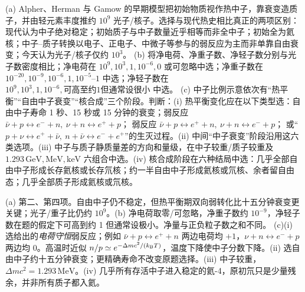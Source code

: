 \begin{exercise}
(a) Alpher、Herman 与 Gamow 的早期模型把初始物质视作热中子，靠衰变造质子，并由轻元素丰度推约 $10^9$ 光子/核子。选择与现代热史相比真正的两项区别：现代认为中子绝对稳定；初始质子与中子数量近乎相等而非全中子；初始全为氦核；中子--质子转换以电子、正电子、中微子等参与的弱反应为主而非单靠自由衰变；今天认为光子/核子仅约 $10^3$。
(b) 将净电荷、净重子数、净轻子数分别与光子数密度相比；净电荷在 $10^9,10^3,1,10^{-6},0$ 或可忽略中选；净重子数在 $10^{-20},10^{-9},10^{-6},1,10^{-5}\text{--}1$ 中选；净轻子数在 $10^9,10^3,1,10^{-6},\text{可高至约1但通常设很小}$ 中选。
(c) 中子比例示意依次有“热平衡”“自由中子衰变”“核合成”三个阶段。判断：(i) 热平衡变化应在以下类型选：自由中子寿命 1 秒、15 秒或 15 分钟的衰变；弱反应
$\bar\nu+p\leftrightarrow e^-+n,\ \nu+n\leftrightarrow e^++p$；
弱反应 $\bar\nu+p\leftrightarrow e^++n,\ \nu+n\leftrightarrow e^-+p$；
或“$p+\nu\leftrightarrow e^++\bar\nu,\ n+\bar\nu\leftrightarrow e^-+e^+$”的生灭过程。(ii) 中间“中子衰变”阶段沿用这六类选项。(iii) 中子与质子静质量差的方向和量级，在中子较重/质子较重及 $1.293\,\mathrm{GeV,MeV,keV}$ 六组合中选。(iv) 核合成阶段在六种结局中选：几乎全部自由中子形成长存氦核或长存氘核；约一半自由中子形成氦核或氘核、余者留自由态；几乎全部质子形成氦核或氘核。
\end{exercise}
\begin{solution}
(a) 第二、第四项。自由中子仍不稳定，但热平衡期双向弱转化比十五分钟衰变更关键；光子/重子比仍约 $10^9$。(b) 净电荷取零/可忽略，净重子数约 $10^{-9}$，净轻子数在题的假定下可高到约 1 但通常设极小。净量与正负粒子数之和不同。
(c)(i) 选给出的\emph{电荷守恒}弱反应；例如 $\bar\nu+p\leftrightarrow e^++n$ 两边电荷均 $+1$，$\nu+n\leftrightarrow e^-+p$ 两边均 0。高温时近似 $n/p\simeq e^{-\Delta m c^2/(k_{\mathrm B} T)}$，温度下降使中子分数下降。(ii) 选自由中子约十五分钟衰变；更精确寿命不改变原题选择。(iii) 中子较重，$\Delta m c^2=1.293\,\mathrm{MeV}$。(iv) 几乎所有存活中子进入稳定的氦-4，原初氘只是少量残余，并非所有质子都入氦。
\end{solution}

